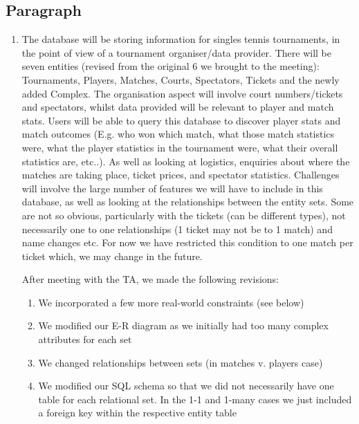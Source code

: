 \documentclass[11pt]{article}
\begin{document}

\begin{mdframed}
\end{mdframed}


\hfill \break
\raggedright\subsection*{Paragraph}

\begin{enumerate}

\item The database will be storing information for singles tennis tournaments, in the point of view of a tournament organiser/data provider. There will be seven entities (revised from the original 6 we brought to the meeting): Tournaments, Players, Matches, Courts, Spectators, Tickets and the newly added Complex. The organisation aspect will involve court numbers/tickets and spectators, whilst data provided will be relevant to player and match stats. Users will be able to query this database to discover player stats and match outcomes (E.g. who won which match, what those match statistics were, what the player statistics in the tournament were, what their overall statistics are, etc..). As well as looking at logistics, enquiries about where the matches are taking place, ticket prices, and spectator statistics. Challenges will involve the large number of features we will have to include in this database, as well as looking at the relationships between the entity sets. Some are not so obvious, particularly with the tickets (can be different types), not necessarily one to one relationships (1 ticket may not be to 1 match) and name changes etc. For now we have restricted this condition to one match per ticket which, we may change in the future.

After meeting with the TA, we made the following revisions:
\begin{enumerate}[label = (\alph*)]
\item We incorporated a few more real-world constraints (see below)
\item We modified our E-R diagram as we initially had too many complex attributes for each set
\item We changed relationships between sets (in matches v. players case)
\item We modified our SQL schema so that we did not necessarily have one table for each relational set. In the 1-1 and 1-many cases we just included a foreign key within the respective entity table 
\end{enumerate}


\end{enumerate}
\end{document}
